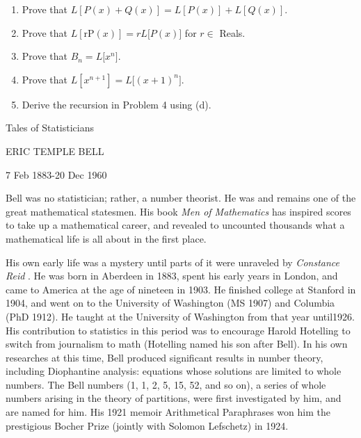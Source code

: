\documentclass[10pt,letter]{article}
\begin{document}
\begin{enumerate}
\def\labelenumi{\alph{enumi}.}

\item
  Prove that
  \(L\left\lbrack P\left( x \right) + Q\left( x \right) \right\rbrack = L\left\lbrack P\left( x \right) \right\rbrack + L\left\lbrack Q\left( x \right) \right\rbrack.\)
\item
  Prove that
  \(L\left\lbrack \text{rP}\left( x \right) \right\rbrack = rL\lbrack P\left( x \right)\rbrack\)
  for \(r \in\) Reals.
\item
  Prove that \(B_{n} = L\lbrack x^{n}\rbrack\).
\item
  Prove that
  \(L\left\lbrack x^{n + 1} \right\rbrack = L\lbrack\left( x + 1 \right)^{n}\rbrack\).
\item
  Derive the recursion in Problem 4 using (d).

\end{enumerate}

Tales of Statisticians

ERIC TEMPLE BELL

7 Feb 1883-20 Dec 1960

Bell was no statistician; rather, a number theorist. He was and remains
one of the great mathematical statesmen. His book \emph{Men of
Mathematics} has inspired scores to take up a mathematical career, and
revealed to uncounted thousands what a mathematical life is all about in
the first place.

His own early life was a mystery until parts of it were unraveled by
\emph{Constance Reid} . He was born in Aberdeen in 1883, spent his early
years in London, and came to America at the age of nineteen in 1903. He
finished college at Stanford in 1904, and went on to the University of
Washington (MS 1907) and Columbia (PhD 1912). He taught at the
University of Washington from that year until1926. His contribution to
statistics in this period was to encourage Harold Hotelling to switch
from journalism to math (Hotelling named his son after Bell). In his own
researches at this time, Bell produced significant results in number
theory, including Diophantine analysis: equations whose solutions are
limited to whole numbers. The Bell numbers (1, 1, 2, 5, 15, 52, and so
on), a series of whole numbers arising in the theory of partitions, were
first investigated by him, and are named for him. His 1921 memoir
Arithmetical Paraphrases won him the prestigious Bocher Prize (jointly
with Solomon Lefschetz) in 1924.
\end{document}
